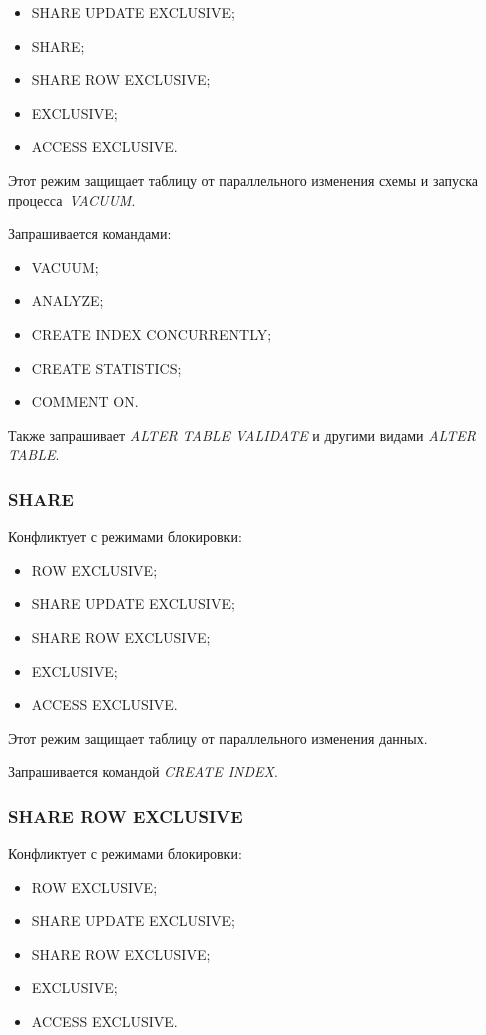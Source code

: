 \begin{itemize}
	\item SHARE UPDATE EXCLUSIVE;
	\item SHARE;
	\item SHARE ROW EXCLUSIVE;
	\item EXCLUSIVE;
	\item ACCESS EXCLUSIVE.
\end{itemize}

Этот режим защищает таблицу от параллельного изменения схемы и запуска процесса~\textit{VACUUM}.

Запрашивается командами:

\begin{itemize}
	\item VACUUM;
	\item ANALYZE;
	\item CREATE INDEX CONCURRENTLY;
	\item CREATE STATISTICS;
	\item COMMENT ON.
\end{itemize}

Также запрашивает \textit{ALTER TABLE VALIDATE} и другими видами \textit{ALTER TABLE}.

\subsubsection*{SHARE}

Конфликтует с режимами блокировки:

\begin{itemize}
	\item ROW EXCLUSIVE;
	\item SHARE UPDATE EXCLUSIVE;
	\item SHARE ROW EXCLUSIVE;
	\item EXCLUSIVE;
	\item ACCESS EXCLUSIVE.
\end{itemize}

Этот режим защищает таблицу от параллельного изменения данных.

Запрашивается командой \textit{CREATE INDEX}.

\subsubsection*{SHARE ROW EXCLUSIVE}

Конфликтует с режимами блокировки:

\begin{itemize}
	\item ROW EXCLUSIVE;
	\item SHARE UPDATE EXCLUSIVE;
	\item SHARE ROW EXCLUSIVE;
	\item EXCLUSIVE;
	\item ACCESS EXCLUSIVE.
\end{itemize}

